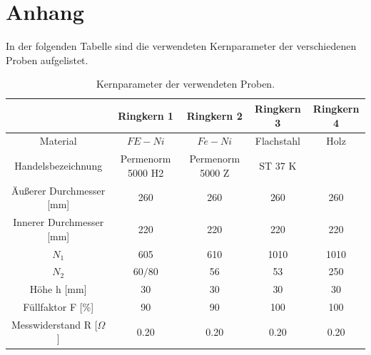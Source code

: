 \section{Anhang}
    In der folgenden Tabelle sind die verwendeten Kernparameter der verschiedenen Proben aufgelistet.
    \begin{table}[H]
        \centering
       \begin{tabular}{|c|c|c|c|c|}
            \hline
                 & Ringkern 1 & Ringkern 2 & Ringkern 3 & Ringkern 4 \\
            \hline
            Material & $FE-Ni$ & $Fe-Ni$ & Flachstahl & Holz \\
            \hline
            Handelsbezeichnung & Permenorm 5000 H2 & Permenorm 5000 Z & ST 37 K & \\
            \hline
            Äußerer Durchmesser [mm] & 260 & 260 & 260 & 260 \\
            \hline
            Innerer Durchmesser [mm] & 220 & 220 & 220 & 220 \\
            \hline
            $N_1$ & 605 & 610 & 1010 & 1010 \\
            \hline
            $N_2$ & $60/80$ & 56 & 53 & 250 \\
            \hline
            Höhe h [mm] & 30 & 30 & 30 & 30 \\
            \hline
            Füllfaktor F [\%] & 90 & 90 & 100 & 100 \\
            \hline
            Messwiderstand R [$\Omega$] & 0.20 & 0.20 & 0.20 & 0.20 \\
            \hline
        \end{tabular}
        \caption{Kernparameter der verwendeten Proben.}
        \label{tab:Kernparameter}
    \end{table}